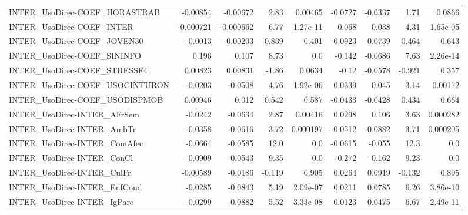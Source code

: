 \begin{tabular}{lrrrrrrrr}
INTER\_UsoDirec-COEF\_HORASTRAB          &    -0.00854 &     -0.00672 &    2.83 &  0.00465 &    -0.0727 &     -0.0337 &         1.71 &        0.0866 \\
INTER\_UsoDirec-COEF\_INTER              &   -0.000721 &    -0.000662 &    6.77 & 1.27e-11 &      0.068 &       0.038 &         4.31 &      1.65e-05 \\
INTER\_UsoDirec-COEF\_JOVEN30            &     -0.0013 &     -0.00203 &   0.839 &    0.401 &    -0.0923 &     -0.0739 &        0.464 &         0.643 \\
INTER\_UsoDirec-COEF\_SININFO            &       0.196 &        0.107 &    8.73 &      0.0 &     -0.142 &     -0.0686 &         7.63 &      2.26e-14 \\
INTER\_UsoDirec-COEF\_STRESSF4           &     0.00823 &      0.00831 &   -1.86 &   0.0634 &      -0.12 &     -0.0578 &       -0.921 &         0.357 \\
INTER\_UsoDirec-COEF\_USOCINTURON        &     -0.0203 &      -0.0508 &    4.76 & 1.92e-06 &     0.0339 &       0.045 &         3.14 &       0.00172 \\
INTER\_UsoDirec-COEF\_USODISPMOB         &     0.00946 &        0.012 &   0.542 &    0.587 &    -0.0433 &     -0.0428 &        0.434 &         0.664 \\
INTER\_UsoDirec-INTER\_AFrSem            &     -0.0242 &      -0.0634 &    2.87 &  0.00416 &     0.0298 &       0.106 &         3.63 &      0.000282 \\
INTER\_UsoDirec-INTER\_AmbTr             &     -0.0358 &      -0.0616 &    3.72 & 0.000197 &    -0.0512 &     -0.0882 &         3.71 &      0.000205 \\
INTER\_UsoDirec-INTER\_ComAfec           &     -0.0664 &      -0.0585 &    12.0 &      0.0 &    -0.0615 &      -0.055 &         12.3 &           0.0 \\
INTER\_UsoDirec-INTER\_ConCl             &     -0.0909 &      -0.0543 &    9.35 &      0.0 &     -0.272 &      -0.162 &         9.23 &           0.0 \\
INTER\_UsoDirec-INTER\_CulFr             &    -0.00589 &      -0.0186 &  -0.119 &    0.905 &     0.0264 &      0.0919 &       -0.132 &         0.895 \\
INTER\_UsoDirec-INTER\_EnfCond           &     -0.0285 &      -0.0843 &    5.19 & 2.09e-07 &     0.0211 &      0.0785 &         6.26 &      3.86e-10 \\
INTER\_UsoDirec-INTER\_IgPare            &     -0.0299 &      -0.0882 &    5.52 & 3.33e-08 &     0.0123 &      0.0475 &         6.67 &      2.49e-11 \\

\end{tabular}
